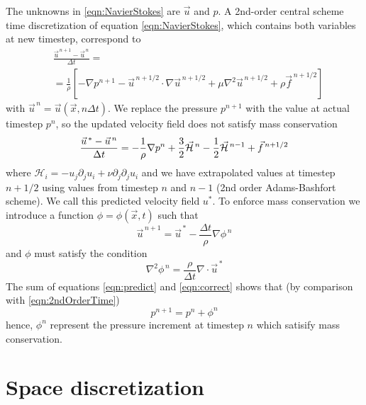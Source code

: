 \documentclass[a4paper,11pt]{report}
\begin{document}
The unknowns in \eqref{eqn:NavierStokes} are $\vec{u}$ and $p$. A 2nd-order central scheme time discretization of equation \eqref{eqn:NavierStokes}, which contains both variables at new timestep, correspond to
\begin{equation}
    \label{eqn:2ndOrderTime}
    \begin{aligned}
        &\frac{\vec{u}^{\, n+1} - \vec{u}^{\, n}}{\Delta t} = \\
        &= \frac{1}{\rho}\left[-\nabla p^{n+1} - \vec{u}^{\, n+1/2} \cdot \nabla \vec{u}^{\, n+1/2} + \mu \nabla^2 \vec{u}^{\, n+1/2} + \rho \vec{f}^{\, n+1/2}\right]
    \end{aligned}
\end{equation}
with $\vec{u}^{\, n} = \vec{u}\left(\vec{x},n\Delta t\right)$.
We replace the pressure $p^{n+1}$ with the value at actual timestep $p^n$, so the updated velocity field does not satisfy mass conservation
\begin{equation}
    \label{eqn:predict}
    \frac{\vec{u}^{\, *} - \vec{u}^{\, n}}{\Delta t} = -\frac{1}{\rho}\nabla p^n + \frac{3}{2}\vec{\mathcal{H}}^{\, n} - \frac{1}{2}\vec{\mathcal{H}}^{\, n-1} + \vec{f}^{\, n+1/2}\\
\end{equation}
where $\mathcal{H}_i = -u_j\partial_j u_i + \nu \partial_j \partial_j u_i$ and we have extrapolated values at timestep $n+1/2$ using values from timestep $n$ and $n-1$ (2nd order Adams-Bashfort scheme). We call this predicted velocity field $u^{*}$. To enforce mass conservation we introduce a function $\phi = \phi\left(\vec{x},t\right)$ such that
\begin{equation}
    \label{eqn:correct}
    \vec{u}^{\, n+1} = \vec{u}^{\, *} - \frac{\Delta t}{\rho}\nabla \phi^{\, n}
\end{equation}
and $\phi$ must satisfy the condition
\begin{equation}
    \label{eqn:Poisson}
    \nabla^2 \phi^{\, n} = \frac{\rho}{\Delta t}\nabla \cdot \vec{u}^{\, *}
\end{equation}
The sum of equations \eqref{eqn:predict} and \eqref{eqn:correct} shows that (by comparison with \eqref{eqn:2ndOrderTime})
\begin{equation}
    p^{n+1} = p^{n} + \phi^{n}
\end{equation}
hence, $\phi^n$ represent the pressure increment at timestep $n$ which satisify mass conservation.

\section*{Space discretization}
\end{document}
